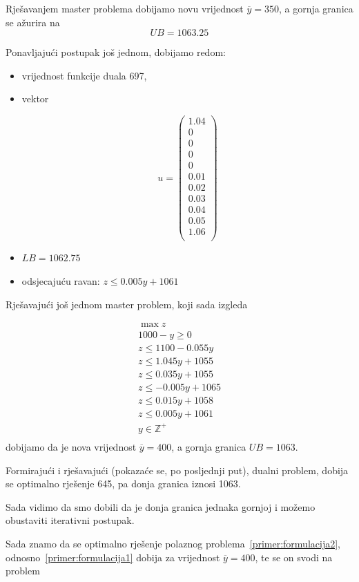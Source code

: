 \documentclass[a4paper, utf8, 11pt, colorlinks]{book}
\theoremstyle{definition}
\begin{document}
 Rješavanjem master problema dobijamo novu vrijednost $\overline{y} =350$, a gornja granica se ažurira na 
 $$UB = 1063.25$$
 
 Ponavljajući postupak još jednom, dobijamo redom: 
 \begin{itemize}
 	\item 
 vrijednost funkcije duala 697,
 \item vektor
 
  $$u=\left(\begin{array}{c}
 	1.04\\
 	0\\
 	0\\
 	0\\
 	0\\
 	0.01\\
 	0.02\\
 	0.03\\
 	0.04\\
 	0.05\\
 	1.06\\
 \end{array}\right)$$
\item $LB = 1062.75$
\item odsjecajuću ravan:  $z\leqslant 0.005y+1061$
\end{itemize}


Rješavajući još jednom master problem, koji sada izgleda

  $$
\begin{aligned}
	\max z\\
	1000-y\geqslant 0\\
	z\leqslant 1100-0.055y\\ 
	z\leqslant 1.045y+1055\\
	z\leqslant 0.035y+1055\\
	z\leqslant -0.005y+1065\\
	z\leqslant 0.015y+1058\\
	z\leqslant 0.005y+1061\\
	y\in\mathbb{Z}^+\\	
\end{aligned}
$$
dobijamo da je nova vrijednost $\overline{y}=400$, a gornja granica $UB = 1063$.

Formirajući i rješavajući (pokazaće se, po posljednji put), dualni problem, dobija se optimalno rješenje 645, pa donja granica iznosi 1063.

Sada vidimo da smo dobili da je donja granica jednaka gornjoj i možemo obustaviti iterativni postupak.

Sada znamo da se optimalno rješenje polaznog problema~\ref{primer:formulacija2}, odnosno~\ref{primer:formulacija1} dobija za vrijednost $\overline{y}=400$, te se on svodi na problem
\end{document}
